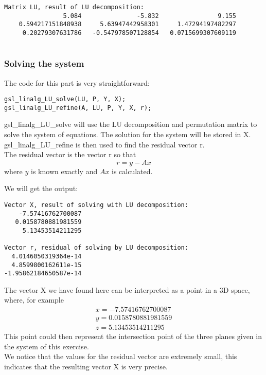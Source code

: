 \documentclass[11pt, a4paper, titlepage, openright]{article}
\begin{document}
\begin{lstlisting}
Matrix LU, result of LU decomposition:
                5.084               -5.832                9.155
    0.594217151848938     5.63947442958301     1.47294197482297
     0.20279307631786   -0.547978507128854   0.0715699307609119
     
\end{lstlisting}
    \subsubsection{Solving the system}
    The code for this part is very straightforward:
\begin{lstlisting}
gsl_linalg_LU_solve(LU, P, Y, X);
gsl_linalg_LU_refine(A, LU, P, Y, X, r);
\end{lstlisting}
    gsl\_linalg\_LU\_solve will use the LU decomposition and permutation matrix to solve the system of equations.
    The solution for the system will be stored in X. gsl\_linalg\_LU\_refine is then used to find the residual vector r.\\
    The residual vector is the vector r so that \[ r = y - Ax \] where \(y\) is known exactly and \(Ax\) is calculated. 
    
    We will get the output:
\begin{lstlisting}
Vector X, result of solving with LU decomposition:
    -7.57416762700087
   0.0158780881981559
     5.13453514211295

Vector r, residual of solving by LU decomposition:
  4.0146050319364e-14
  4.8599800162611e-15
-1.95862184650587e-14
\end{lstlisting}
    The vector X we have found here can be interpreted as a point in a 3D space, where, for example 
\begin{align*}
    x = -7.57416762700087 \\ 
    y = 0.0158780881981559 \\
    z =  5.13453514211295
\end{align*}
    This point could then represent the intersection point of the three planes given in the system of this exercise. \\
    We notice that the values for the residual vector are extremely small, this indicates that the resulting 
    vector X is very precise.
\end{document}
